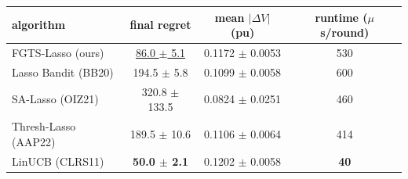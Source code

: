 \begin{tabular}{lccc}
\toprule
algorithm & final regret & mean $|\Delta V|$ (pu) & runtime ($\mu$s/round) \\
\midrule
FGTS-Lasso (ours) & \underline{86.0 $\pm$ 5.1} & 0.1172 $\pm$ 0.0053 & 530 \\
Lasso Bandit (BB20) & 194.5 $\pm$ 5.8 & 0.1099 $\pm$ 0.0058 & 600 \\
SA-Lasso (OIZ21) & 320.8 $\pm$ 133.5 & 0.0824 $\pm$ 0.0251 & 460 \\
Thresh-Lasso (AAP22) & 189.5 $\pm$ 10.6 & 0.1106 $\pm$ 0.0064 & 414 \\
LinUCB (CLRS11) & \textbf{50.0 $\pm$ 2.1} & 0.1202 $\pm$ 0.0058 & \textbf{40} \\
\bottomrule
\end{tabular}